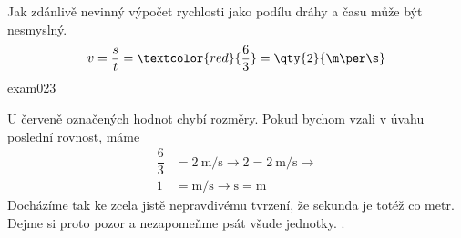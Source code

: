 \begin{fyzexam}{Jak zdánlivě nevinný výpočet rychlosti jako podílu dráhy a času může být nesmyslný.  
  \[v = \dfrac{s}{t} = \textcolor{red}{\dfrac{6}{3}} =
  \qty{2}{\m\per\s}\]}{exam023}    

  U červeně označených hodnot chybí rozměry. Pokud bychom vzali v úvahu poslední rovnost, máme
  \begin{align*}
    \dfrac{6}{3} &= \qty{2}{\m\per\s}  \rightarrow 2 = \qty{2}{\m\per\s}  \rightarrow \\
               1 &= \unit{\m\per\s}     \rightarrow     \unit{\s} = \unit{\m} 
  \end{align*}
  Docházíme tak ke zcela jistě nepravdivému tvrzení, že sekunda je totéž co metr. Dejme si proto
  pozor a nezapomeňme psát všude jednotky. \cite[s.~1]{Kulhanek2020}. 
\end{fyzexam}